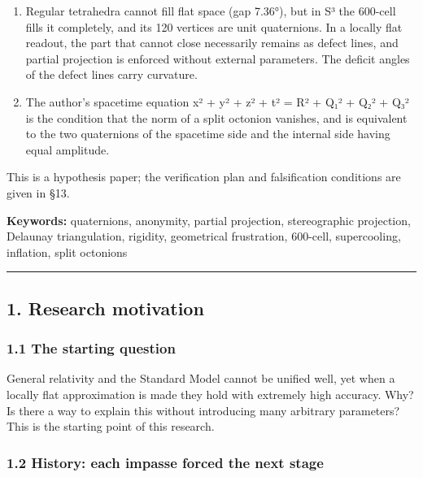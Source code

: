 \documentclass[
  a4paper,
]{article}
\begin{document}
\begin{enumerate}
  164. The end is given structurally as faces close and r approaches 1.
\item
  Regular tetrahedra cannot fill flat space (gap 7.36°), but in S³ the
  600-cell fills it completely, and its 120 vertices are unit
  quaternions. In a locally flat readout, the part that cannot close
  necessarily remains as defect lines, and partial projection is
  enforced without external parameters. The deficit angles of the defect
  lines carry curvature.
\item
  The author's spacetime equation x² + y² + z² + t² = R² + Q₁² + Q₂² +
  Q₃² is the condition that the norm of a split octonion vanishes, and
  is equivalent to the two quaternions of the spacetime side and the
  internal side having equal amplitude.
\end{enumerate}

This is a hypothesis paper; the verification plan and falsification
conditions are given in §13.

\textbf{Keywords:} quaternions, anonymity, partial projection,
stereographic projection, Delaunay triangulation, rigidity, geometrical
frustration, 600-cell, supercooling, inflation, split octonions

\begin{center}\rule{0.5\linewidth}{0.5pt}\end{center}

\subsection{1. Research motivation}\label{research-motivation}

\subsubsection{1.1 The starting question}\label{the-starting-question}

General relativity and the Standard Model cannot be unified well, yet
when a locally flat approximation is made they hold with extremely high
accuracy. Why? Is there a way to explain this without introducing many
arbitrary parameters? This is the starting point of this research.

\subsubsection{1.2 History: each impasse forced the next
stage}\label{history-each-impasse-forced-the-next-stage}
\end{document}
